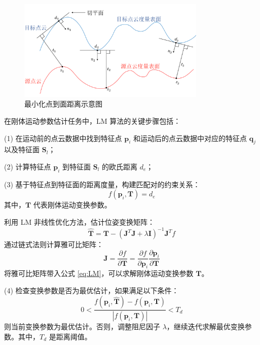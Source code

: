 \begin{figure}[htbp]
    \centering
    \vspace{-0.5cm}
    \includegraphics[width=0.8\textwidth]{images/LM_point2plane.pdf}
    \caption{最小化点到面距离示意图}
    \label{fig:point2plane} 
    \vspace{-1.5cm}
\end{figure}

在刚体运动参数估计任务中，LM 算法的关键步骤包括：

 (1) 在运动前的点云数据中找到特征点 $\boldsymbol{p}_i$ 和运动后的点云数据中对应的特征点 $\boldsymbol{q}_j$ 以及特征面 $\boldsymbol{S}_l$；

 (2) 计算特征点 $\boldsymbol{p}_i$ 到特征面 $\boldsymbol{S}_l$ 的欧氏距离 $d_e$；

 (3) 基于特征点到特征面的距离度量，构建匹配对的约束关系：
\begin{equation}
f(\boldsymbol{p}_i, \boldsymbol{T}) = d_e
\end{equation}
其中，$\boldsymbol{T}$ 代表刚体运动变换参数。

利用 LM 非线性优化方法，估计位姿变换矩阵：
\begin{equation}
\hat{\boldsymbol{T}} = \boldsymbol{T} - (\boldsymbol{J}^T \boldsymbol{J} + \lambda \boldsymbol{I})^{-1} \boldsymbol{J}^T f
\label{eq:LM}
\end{equation}
通过链式法则计算雅可比矩阵：
\begin{equation}
\boldsymbol{J} = \frac{\partial f}{\partial \boldsymbol{T}} = \frac{\partial f}{\partial \boldsymbol{p}_i} \frac{\partial \boldsymbol{p}_i}{\partial \boldsymbol{T}}
\end{equation}
将雅可比矩阵带入公式 \ref{eq:LM}，可以求解刚体运动变换参数 $\boldsymbol{T}$。

 (4) 检查变换参数是否为最优估计，如果满足以下条件：
\begin{equation}
0 < \frac{f(\boldsymbol{p}_i, \hat{\boldsymbol{T}}) - f(\boldsymbol{p}_i, \boldsymbol{T})}{|f(\boldsymbol{p}_i, \boldsymbol{T})|} < T_d
\end{equation}
则当前变换参数为最优估计。否则，调整阻尼因子 $\lambda$，继续迭代求解最优变换参数。其中，$T_d$ 是距离阈值。

